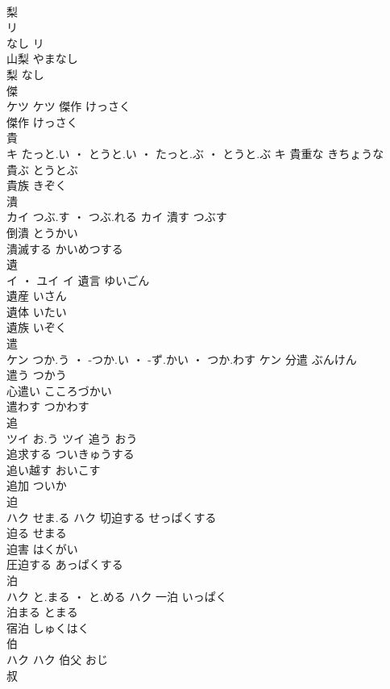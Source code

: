\documentclass[8pt]{extreport}
\begin{document}
\begin{CJK}{UTF8}{min}
\\	梨	
\\	リ
\\	なし	リ
\\	山梨	やまなし	
\\	梨	なし	
\\	傑	
\\	ケツ		ケツ	傑作	けっさく	
\\	傑作	けっさく	
\\	貴	
\\	キ	たっと.い ・ とうと.い ・ たっと.ぶ ・ とうと.ぶ	キ	貴重な	きちょうな	
\\	貴ぶ	とうとぶ	
\\	貴族	きぞく	
\\	潰	
\\	カイ	つぶ.す ・ つぶ.れる	カイ	潰す	つぶす	
\\	倒潰	とうかい	
\\	潰滅する	かいめつする	
\\	遺	
\\	イ ・ ユイ		イ	遺言	ゆいごん	
\\	遺産	いさん	
\\	遺体	いたい	
\\	遺族	いぞく	
\\	遣	
\\	ケン	つか.う ・ -つか.い ・ -ず.かい ・ つか.わす	ケン	分遣	ぶんけん	
\\	遣う	つかう	
\\	心遣い	こころづかい	
\\	遣わす	つかわす	
\\	追	
\\	ツイ	お.う	ツイ	追う	おう	
\\	追求する	ついきゅうする	
\\	追い越す	おいこす	
\\	追加	ついか	
\\	迫	
\\	ハク	せま.る	ハク	切迫する	せっぱくする	
\\	迫る	せまる	
\\	迫害	はくがい	
\\	圧迫する	あっぱくする	
\\	泊	
\\	ハク	と.まる ・ と.める	ハク	一泊	いっぱく	
\\	泊まる	とまる	
\\	宿泊	しゅくはく	
\\	伯	
\\	ハク		ハク	伯父	おじ	
\\	叔 

\end{CJK}
\end{document}

